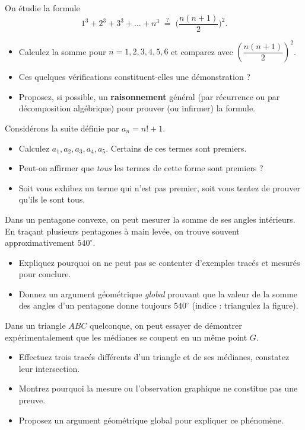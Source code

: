 \begin{exercise}
    On étudie la formule
    \[
      1^3 + 2^3 + 3^3 + \dots + n^3 \;\stackrel{?}{=}\; \biggl(\frac{n(n+1)}{2}\biggr)^2.
    \]
    \begin{itemize}
      \item Calculez la somme pour $n=1,2,3,4,5,6$ et comparez avec $\left(\dfrac{n(n+1)}{2}\right)^2$.
      \item Ces quelques vérifications constituent-elles une démonstration ?
      \item Proposez, si possible, un \textbf{raisonnement} général (par récurrence ou par décomposition algébrique) pour prouver (ou infirmer) la formule.
    \end{itemize}
\end{exercise}

\begin{exercise}
    Considérons la suite définie par $a_n = n! + 1$.
    \begin{itemize}
      \item Calculez $a_1, a_2, a_3, a_4, a_5$. Certains de ces termes sont premiers.
      \item Peut-on affirmer que \emph{tous} les termes de cette forme sont premiers ?
      \item Soit vous exhibez un terme qui n’est pas premier, soit vous tentez de prouver qu’ils le sont tous.
    \end{itemize}
\end{exercise}

\begin{exercise}
    Dans un pentagone convexe, on peut mesurer la somme de ses angles intérieurs. En traçant plusieurs pentagones à main levée, on trouve souvent approximativement $540^\circ$.
    \begin{itemize}
      \item Expliquez pourquoi on ne peut pas se contenter d’exemples tracés et mesurés pour conclure.
      \item Donnez un argument géométrique \emph{global} prouvant que la valeur de la somme des angles d’un pentagone donne toujours $540^\circ$ (indice : triangulez la figure).
    \end{itemize}
\end{exercise}

\begin{exercise}
Dans un triangle $ABC$ quelconque, on peut essayer de démontrer expérimentalement que les médianes se coupent en un même point $G$.
\begin{itemize}
  \item Effectuez trois tracés différents d’un triangle et de ses médianes, constatez leur intersection.
  \item Montrez pourquoi la mesure ou l’observation graphique ne constitue pas une preuve.
  \item Proposez un argument géométrique global pour expliquer ce phénomène.

\end{itemize}
\end{exercise}


